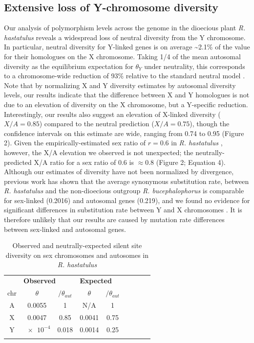 \documentclass[9pt,twocolumn,twoside,lineno]{gsajnl}
\begin{document}
\subsection*{Extensive loss of Y-chromosome diversity}
Our analysis of polymorphism levels across the genome in the dioecious plant \textit{R. hastatulus} reveals a widespread loss of neutral diversity from the Y chromosome. In particular, neutral diversity for Y-linked genes is on average \textasciitilde 2.1\% of the value for their homologues on the X chromosome. Taking 1/4 of the mean autosomal diversity as the equilibrium expectation for $\theta_{Y}$ under neutrality, this corresponds to a chromosome-wide reduction of 93\% relative to the standard neutral model \citep{wright1931evolution}. Note that by normalizing X and Y diversity estimates by autosomal diversity levels, our results indicate that the difference between X and Y homologues is not due to an elevation of diversity on the X chromosome, but a Y-specific reduction. Interestingly, our results also suggest an elevation of X-linked diversity ($X/A=0.85$) compared to the neutral prediction ($X/A=0.75$), though the confidence intervals on this estimate are wide, ranging from 0.74 to 0.95 (Figure 2). Given the empirically-estimated sex ratio of $r=0.6$ in \textit{R. hastatulus} \citep{pickup2013influence}, however, the X/A elevation we observed is not unexpected; the neutrally-predicted X/A ratio for a sex ratio of 0.6 is $\approx 0.8$ (Figure 2; Equation 4). Although our estimates of diversity have not been normalized by divergence, previous work has shown that the average synonymous substitution rate, between \textit{R. hastatulus} and the non-dioecious outgroup \textit{R. bucephalophorus} is comparable for sex-linked (0.2016) and autosomal genes (0.219), and we found no evidence for significant differences in substitution rate between Y and X chromosomes \citep{hough2014}. It is therefore unlikely that our results are caused by mutation rate differences between sex-linked and autosomal genes.

\begin{table}[htb]
\centering
\caption{Observed and neutrally-expected silent site diversity on sex chromosomes and autosomes in \textit{R. hastatulus}}
\begin{tabular}{ccccccccc}
\textbf{} & \multicolumn{2}{l}{\textbf{Observed}} & \multicolumn{3}{l}{\textbf{Expected}} \\

chr & $\theta$ & $/\theta_{aut}$ & $\theta$ & $/\theta_{aut}$  \\
\midrule
A & 0.0055 & 1 & N/A & 1 \\
X & 0.0047 & 0.85 & 0.0041 & 0.75 \\
Y & $\num{e-4}$ & 0.018 & 0.0014 & 0.25 \\
\addlinespace

\bottomrule
\end{tabular}
\end{table}
\end{document}
